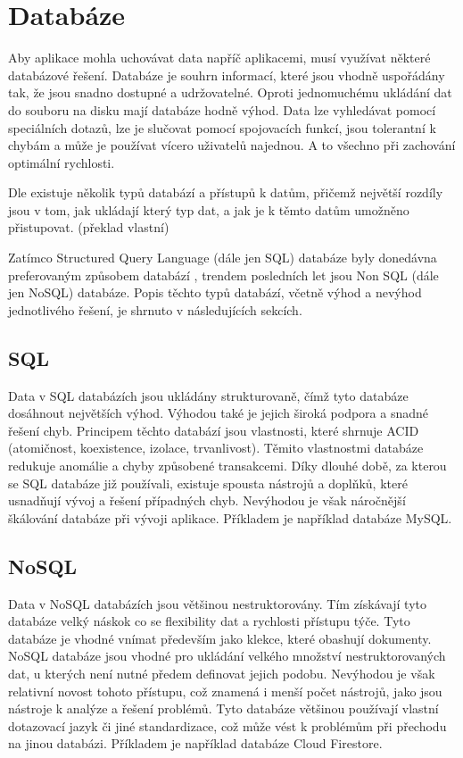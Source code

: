 \section{Databáze}

Aby aplikace mohla uchovávat data napříč aplikacemi,
musí využívat některé databázové řešení.
Databáze je souhrn informací,
které jsou vhodně uspořádány tak,
že jsou snadno dostupné a udržovatelné.
Oproti jednomuchému ukládání dat do souboru na disku mají databáze hodně výhod.
Data lze vyhledávat pomocí speciálních dotazů,
lze je slučovat pomocí spojovacích funkcí,
jsou tolerantní k chybám
a může je používat vícero uživatelů najednou.
A to všechno při zachování optimální rychlosti.
\cite{database}

Dle \cite{sql_nosql} existuje několik typů databází a přístupů k datům,
přičemž největší rozdíly jsou v tom,
jak ukládají který typ dat,
a jak je k těmto datům umožněno přistupovat.
\emph{}
\cite{sql_nosql} (překlad vlastní)

Zatímco Structured Query Language (dále jen SQL) databáze byly donedávna
preferovaným způsobem databází \cite{sql_nosql},
trendem posledních let jsou Non SQL (dále jen NoSQL) databáze.
Popis těchto typů databází,
včetně výhod a nevýhod jednotlivého řešení,
je shrnuto v následujících sekcích.

\subsection{SQL}

Data v SQL databázích jsou ukládány strukturovaně,
čímž tyto databáze dosáhnout největších výhod.
Výhodou také je jejich široká podpora a snadné řešení chyb.
Principem těchto databází jsou vlastnosti,
které shrnuje ACID (atomičnost, koexistence, izolace, trvanlivost).
Těmito vlastnostmi databáze redukuje anomálie a chyby způsobené transakcemi.
Díky dlouhé době,
za kterou se SQL databáze již používali,
existuje spousta nástrojů a doplňků,
které usnadňují vývoj a řešení případných chyb.
Nevýhodou je však náročnější škálování databáze při vývoji aplikace.
Příkladem je například databáze MySQL.
\cite{sql_nosql}

\subsection{NoSQL}

Data v NoSQL databázích jsou většinou nestruktorovány.
Tím získávají tyto databáze velký náskok co se flexibility dat a rychlosti
přístupu týče.
Tyto databáze je vhodné vnímat především jako klekce,
které obashují dokumenty. 
NoSQL databáze jsou vhodné pro ukládání velkého množství nestruktorovaných dat,
u kterých není nutné předem definovat jejich podobu.
Nevýhodou je však relativní novost tohoto přístupu,
což znamená i menší počet nástrojů,
jako jsou nástroje k analýze a řešení problémů.
Tyto databáze většinou používají vlastní dotazovací jazyk či jiné standardizace,
což může vést k problémům při přechodu na jinou databázi.
\cite{sql_nosql}
Příkladem je například databáze Cloud Firestore.

